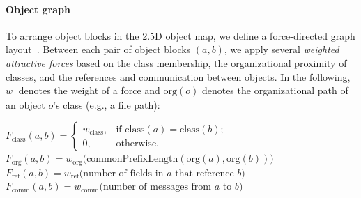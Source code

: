 \paragraph{Object graph}
\label{sec:visualization_approach/mapping/object_graph}

To arrange object blocks in the 2.5D object map, we define a force-directed graph layout~\cite{fruchterman1991graph}.
Between each pair of object blocks $(a, b)$, we apply several \emph{weighted attractive forces} based on the class membership, the organizational proximity of classes, and the references and communication between objects.
In the following, $w_{\_}$ denotes the weight of a force and $\text{org}(o)$ denotes the organizational path of an object $o$'s class (e.g., a file path):


\begin{algorithm}
	$F_{\text{class}}(a, b) = \begin{cases}w_{\text{class}}, & \text{if $\text{class}(a) = \text{class}(b)$;} \\ 0, & \text{otherwise}.\end{cases}$ \;
	$F_{\text{org}}(a, b) = w_{\text{org}}\bigl(\text{commonPrefixLength}(\text{org}(a), \text{org}(b))\bigr)$ \;
	$F_{\text{ref}}(a, b) = w_{\text{ref}}\bigl(\text{number of fields in $a$ that reference $b$}\bigr)$ \;
	$F_{\text{comm}}(a, b) = w_{\text{comm}}\bigl(\text{number of messages from $a$ to $b$}\bigr)$ \;
\end{algorithm}

